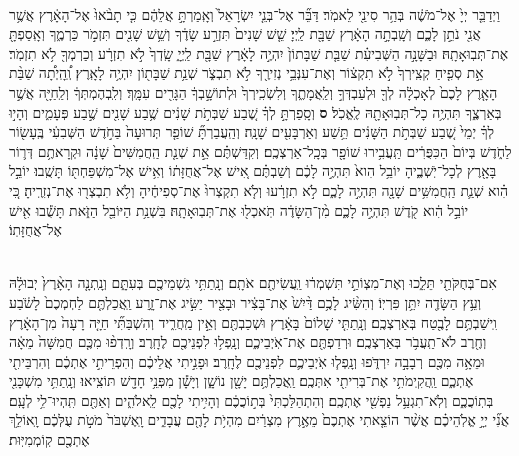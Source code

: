 \documentclass[twoside, openany, parskip=half, 11pt]{book}
\begin{document}
\begin{footnotesize}
\begin{multicols}{2}
\\
 וַיְדַבֵּ֤ר יְיָ֙ אֶל־מֹשֶׁ֔ה בְּהַ֥ר סִינַ֖י לֵאמֹֽר׃ דַּבֵּ֞ר אֶל־בְּנֵ֤י יִשְׂרָאֵל֙ וְאָֽמַרְתָּ֣ אֲלֵהֶ֔ם כִּ֤י תָבֹ֨אוּ֙ אֶל־הָאָ֔רֶץ אֲשֶׁ֥ר אֲנִ֖י נֹתֵ֣ן לָכֶ֑ם וְשָֽׁבְתָ֣ה הָאָ֔רֶץ שַׁבָּ֖ת לַֽיְיָ׃ שֵׁ֤שׁ שָׁנִים֙ תִּזְרַ֣ע שָׂדֶ֔ךָ וְשֵׁ֥שׁ שָׁנִ֖ים תִּזְמֹ֣ר כַּרְמֶ֑ךָ וְאָֽסַפְתָּ֖ אֶת־תְּבֽוּאָתָֽהּ׃  וּבַשָּׁנָ֣ה הַשְּׁבִיעִ֗ת שַׁבַּ֤ת שַׁבָּתוֹן֙ יִהְיֶ֣ה לָאָ֔רֶץ שַׁבָּ֖ת לַֽיְיָ֑ שָֽׂדְךָ֙ לֹ֣א תִזְרָ֔ע וְכַרְמְךָ֖ לֹ֥א תִזְמֹֽר׃ אֵ֣ת סְפִ֤יחַ קְצִֽירְךָ֙ לֹ֣א תִקְצ֔וֹר וְאֶת־עִנְּבֵ֥י נְזִירֶ֖ךָ לֹ֣א תִבְצֹ֑ר שְׁנַ֥ת שַׁבָּת֖וֹן יִהְיֶ֥ה לָאָֽרֶץ׃ וְֽ֠הָֽיְתָ֠ה שַׁבַּ֨ת הָאָ֤רֶץ לָכֶם֙ לְאָכְלָ֔ה לְךָ֖ וּלְעַבְדְּךָ֣ וְלַֽאֲמָתֶ֑ךָ וְלִשְׂכִֽירְךָ֙ וּלְתוֹשָׁ֣בְךָ֔ הַגָּרִ֖ים עִמָּֽךְ׃ וְלִֽבְהֶמְתְּךָ֔ וְלַֽחַיָּ֖ה אֲשֶׁ֣ר בְּאַרְצֶ֑ךָ תִּהְיֶ֥ה כָל־תְּבֽוּאָתָ֖הּ לֶֽאֱכֹֽל׃ \textbf{ס}  וְסָֽפַרְתָּ֣ לְךָ֗ שֶׁ֚בַע שַׁבְּתֹ֣ת שָׁנִ֔ים שֶׁ֥בַע שָׁנִ֖ים שֶׁ֣בַע פְּעָמִ֑ים וְהָי֣וּ לְךָ֗ יְמֵי֙ שֶׁ֚בַע שַׁבְּתֹ֣ת הַשָּׁנִ֔ים תֵּ֥שַׁע וְאַרְבָּעִ֖ים שָׁנָֽה׃ וְהַֽעֲבַרְתָּ֞ שׁוֹפַ֤ר תְּרוּעָה֙ בַּחֹ֣דֶשׁ הַשְּׁבִעִ֔י בֶּֽעָשׂ֖וֹר לַחֹ֑דֶשׁ בְּיוֹם֙ הַכִּפֻּרִ֔ים תַּֽעֲבִ֥ירוּ שׁוֹפָ֖ר בְּכָֽל־אַרְצְכֶֽם׃ וְקִדַּשְׁתֶּ֗ם אֵ֣ת שְׁנַ֤ת הַֽחֲמִשִּׁים֙ שָׁנָ֔ה וּקְרָאתֶ֥ם דְּר֛וֹר בָּאָ֖רֶץ לְכָל־יֹֽשְׁבֶ֑יהָ יוֹבֵ֥ל הִוא֙ תִּהְיֶ֣ה לָכֶ֔ם וְשַׁבְתֶּ֗ם אִ֚ישׁ אֶל־אֲחֻזָּת֔וֹ וְאִ֥ישׁ אֶל־מִשְׁפַּחְתּ֖וֹ תָּשֻֽׁבוּ׃ יוֹבֵ֣ל הִ֗וא שְׁנַ֛ת הַֽחֲמִשִּׁ֥ים שָׁנָ֖ה תִּהְיֶ֣ה לָכֶ֑ם לֹ֣א תִזְרָ֔עוּ וְלֹ֤א תִקְצְרוּ֙ אֶת־סְפִיחֶ֔יהָ וְלֹ֥א תִבְצְר֖וּ אֶת־נְזִרֶֽיהָ׃ כִּ֚י יוֹבֵ֣ל הִ֔וא קֹ֖דֶשׁ תִּהְיֶ֣ה לָכֶ֑ם מִ֨ן־הַשָּׂדֶ֔ה תֹּֽאכְל֖וּ אֶת־תְּבֽוּאָתָֽהּ׃ בִּשְׁנַ֥ת הַיּוֹבֵ֖ל הַזֹּ֑את תָּשֻׁ֕בוּ אִ֖ישׁ אֶל־אֲחֻזָּתֽוֹ׃


\\
 אִם־בְּחֻקֹּתַ֖י תֵּלֵ֑כוּ וְאֶת־מִצְוֹתַ֣י תִּשְׁמְר֔וּ וַֽעֲשִׂיתֶ֖ם אֹתָֽם׃ וְנָֽתַתִּ֥י גִשְׁמֵיכֶ֖ם בְּעִתָּ֑ם וְנָֽתְנָ֤ה הָאָ֨רֶץ֙ יְבוּלָ֔הּ וְעֵ֥ץ הַשָּׂדֶ֖ה יִתֵּ֥ן פִּרְיֽוֹ׃ וְהִשִּׂ֨יג לָכֶ֥ם דַּ֨יִשׁ֙ אֶת־בָּצִ֔יר וּבָצִ֖יר יַשִּׂ֣יג אֶת־זָ֑רַע וַֽאֲכַלְתֶּ֤ם לַחְמְכֶם֙ לָשֹׂ֔בַע וִֽישַׁבְתֶּ֥ם לָבֶ֖טַח בְּאַרְצְכֶֽם׃  וְנָֽתַתִּ֤י שָׁלוֹם֙ בָּאָ֔רֶץ וּשְׁכַבְתֶּ֖ם וְאֵ֣ין מַֽחֲרִ֑יד וְהִשְׁבַּתִּ֞י חַיָּ֤ה רָעָה֙ מִן־הָאָ֔רֶץ וְחֶ֖רֶב לֹא־תַֽעֲבֹ֥ר בְּאַרְצְכֶֽם׃ וּרְדַפְתֶּ֖ם אֶת־אֹֽיְבֵיכֶ֑ם וְנָֽפְל֥וּ לִפְנֵיכֶ֖ם לֶחָֽרֶב׃ וְרָֽדְפ֨וּ מִכֶּ֤ם חֲמִשָּׁה֙ מֵאָ֔ה וּמֵאָ֥ה מִכֶּ֖ם רְבָבָ֣ה יִרְדֹּ֑פוּ וְנָֽפְל֧וּ אֹֽיְבֵיכֶ֛ם לִפְנֵיכֶ֖ם לֶחָֽרֶב׃ וּפָנִ֣יתִי אֲלֵיכֶ֔ם וְהִפְרֵיתִ֣י אֶתְכֶ֔ם וְהִרְבֵּיתִ֖י אֶתְכֶ֑ם וַֽהֲקִֽימֹתִ֥י אֶת־בְּרִיתִ֖י אִתְּכֶֽם׃  וַֽאֲכַלְתֶּ֥ם יָשָׁ֖ן נוֹשָׁ֑ן וְיָשָׁ֕ן מִפְּנֵ֥י חָדָ֖שׁ תּוֹצִֽיאוּ׃ וְנָֽתַתִּ֥י מִשְׁכָּנִ֖י בְּתֽוֹכֲכֶ֑ם וְלֹֽא־תִגְעַ֥ל נַפְשִׁ֖י אֶתְכֶֽם׃ וְהִתְהַלַּכְתִּי֙ בְּת֣וֹכֲכֶ֔ם וְהָיִ֥יתִי לָכֶ֖ם לֵֽאלֹהִ֑ים וְאַתֶּ֖ם תִּֽהְיוּ־לִ֥י לְעָֽם׃ אֲנִ֞י יְיָ֣ אֱלֹֽהֵיכֶ֗ם אֲשֶׁ֨ר הוֹצֵ֤אתִי אֶתְכֶם֙ מֵאֶ֣רֶץ מִצְרַ֔יִם מִהְיֹ֥ת לָהֶ֖ם עֲבָדִ֑ים וָֽאֶשְׁבֹּר֙ מֹטֹ֣ת עֻלְּכֶ֔ם וָֽאוֹלֵ֥ךְ אֶתְכֶ֖ם קֽוֹמְמִיּֽוּת׃


\end{multicols}
\end{footnotesize}
\end{document}
